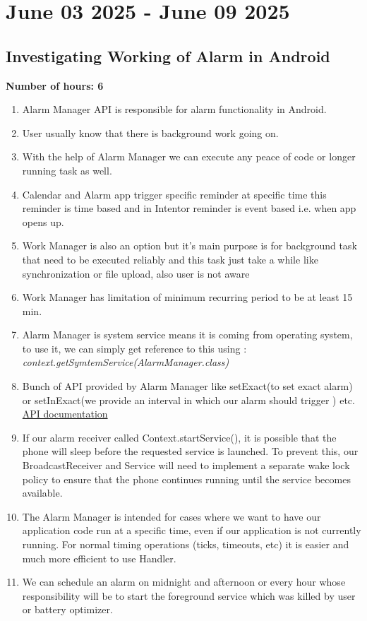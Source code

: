 \documentclass[12pt]{article}
\begin{document}
    \section{June 03 2025 - June 09 2025}
    \subsection{Investigating Working of Alarm in Android}
    {\bf Number of hours: 6}
    \begin{enumerate}
        \item Alarm Manager API is responsible for alarm functionality in Android.
        \item User usually know that there is background work going on.
        \item With the help of Alarm Manager we can execute any peace of code or longer running task as well.
        \item Calendar and Alarm app trigger specific reminder at specific time this reminder is time based and in Intentor reminder is event based i.e. when app opens up.
        \item Work Manager is also an option but it's main purpose is for background task that need to be executed reliably and this task just take a while like synchronization or file upload, also user is not aware 
        \item Work Manager has limitation of minimum recurring period to be at least 15 min.
        \item Alarm Manager is system service means it is coming from operating system, to use it, we can simply get reference to this using : \textit{context.getSymtemService(AlarmManager.class)}
        \item Bunch of API provided by Alarm Manager like setExact(to set exact alarm) or setInExact(we provide an interval in which our alarm should trigger ) etc. \href{https://developer.android.com/reference/android/app/AlarmManager}{API documentation}
        \item If our alarm receiver called Context.startService(), it is possible that the phone will sleep before the requested service is launched. To prevent this, our BroadcastReceiver and Service will need to implement a separate wake lock policy to ensure that the phone continues running until the service becomes available.
        \item The Alarm Manager is intended for cases where we want to have our application code run at a specific time, even if our application is not currently running. For normal timing operations (ticks, timeouts, etc) it is easier and much more efficient to use Handler.
        \item We can schedule an alarm on midnight and afternoon or every hour whose responsibility will be to start the foreground service which was killed by user or battery optimizer. 
        \end{enumerate}
\end{document}
